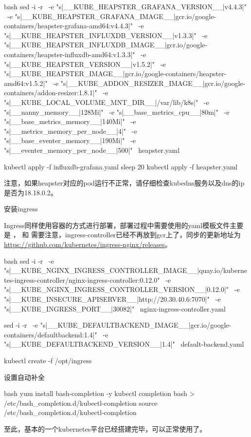 \begin{outline}[enumerate]
\begin{code-in-enumerate}{bash}
sed -i -r \
    -e "s|__KUBE_HEAPSTER_GRAFANA_VERSION__|v4.4.3|" \
    -e "s|__KUBE_HEAPSTER_GRAFANA_IMAGE__|gcr.io/google-containers/heapster-grafana-amd64:v4.4.3|" \
    -e "s|__KUBE_HEAPSTER_INFLUXDB_VERSION__|v1.3.3|" \
    -e "s|__KUBE_HEAPSTER_INFLUXDB_IMAGE__|gcr.io/google-containers/heapster-influxdb-amd64:v1.3.3|" \
    -e "s|__KUBE_HEAPSTER_VERSION__|v1.5.2|" \
    -e "s|__KUBE_HEAPSTER_IMAGE__|gcr.io/google-containers/heapster-amd64:v1.5.2|" \
    -e "s|__KUBE_ADDON_RESIZER_IMAGE__|gcr.io/google-containers/addon-resizer:1.8.1|" \
    -e "s|__KUBE_LOCAL_VOLUME_MNT_DIR__|/var/lib/k8s|" \
    -e "s|__nanny_memory__|128Mi|" \
    -e "s|__base_metrics_cpu__|80m|" \
    -e "s|__base_metrics_memory__|140Mi|" \
    -e "s|__metrics_memory_per_node__|4|" \
    -e "s|__base_eventer_memory__|190Mi|" \
    -e "s|__eventer_memory_per_node__|500|" \
    heapster.yaml

kubectl apply -f influxdb-grafana.yaml
sleep 20
kubectl apply -f heapster.yaml
\end{code-in-enumerate}
注意，如果heapster对应的pod运行不正常，请仔细检查kubedns服务以及dns的ip是否为18.18.0.2。

\1 安装ingress

Ingress同样使用容器的方式进行部署，部署过程中需要使用的yaml模板文件主要是
，
和
需要注意，ingress-controller已经不再放到gcr上了，同步的更新地址为\url{https://github.com/kubernetes/ingress-nginx/releases}。
\begin{code-in-enumerate}{bash}
sed -i -r \
    -e "s|__KUBE_NGINX_INGRESS_CONTROLLER_IMAGE__|quay.io/kubernetes-ingress-controller/nginx-ingress-controller:0.12.0" \
    -e "s|__KUBE_NGINX_INGRESS_CONTROLLER_VERSION__|0.12.0|" \
    -e "s|__KUBE_INSECURE_APISERVER__|http://20.30.40.6:7070|" \
    -e "s|__KUBE_INGRESS_PORT__|30082|" \
    nginx-ingress-controller.yaml

sed -i -r \
    -e "s|__KUBE_DEFAULTBACKEND_IMAGE__|gcr.io/google-containers/defaultbackend:1.4|" \
    -e "s|__KUBE_DEFAULTBACKEND_VERSION__|1.4|" \
    default-backend.yaml

kubectl create -f /opt/ingress
\end{code-in-enumerate}

\1 设置自动补全
\begin{code-in-enumerate}{bash}
yum install bash-completion -y
kubectl completion bash > /etc/bash_completion.d/kubectl-completion
source /etc/bash_completion.d/kubectl-completion
\end{code-in-enumerate}

至此，基本的一个kubernetes平台已经搭建完毕，可以正常使用了。
\end{outline}
